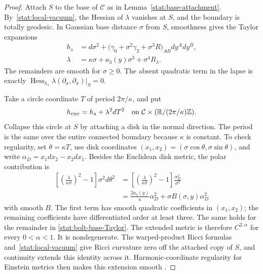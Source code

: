 \begin{proof}
Attach $S$ to the base of $\mathcal C$ as in
Lemma~\ref{stat:base-attachment}.  By~\eqref{stat:local-vacuum},
the Hessian of $\lambda$ vanishes at $S$, and the boundary is
totally geodesic.  In Gaussian base distance $\sigma$ from $S$,
smoothness gives the Taylor expansions
\begin{align}
 h_s&=d\sigma^2+
       \bigl(\gamma_0+\sigma^2\gamma_2
                         +\sigma^3R\bigr)_{AB}dy^A dy^B,
 \label{stat:bolt-base-Taylor}\\
 \lambda&=\kappa\sigma+a_3(y)\sigma^3
                              +\sigma^4R_\lambda.
 \label{stat:bolt-lapse-Taylor}
\end{align}
The remainders are smooth for $\sigma\geq0$.  The absent quadratic
term in the lapse is exactly
$\operatorname{Hess}_{h_s}\lambda(\partial_\sigma,
\partial_\sigma)|_S=0$.

Take a circle coordinate $T$ of period $2\pi/\kappa$, and put
\begin{equation}
 h_{\mathrm{circ}}=h_s+\lambda^2dT^2
 \quad\hbox{on }\mathcal C\times
                  (\mathbb R/(2\pi/\kappa)\mathbb Z).
 \label{stat:circle-metric}
\end{equation}
Collapse this circle at $S$ by attaching a disk in the normal
direction.  The period is the same over the entire connected
boundary because $\kappa$ is constant.  To check regularity, set
$\theta=\kappa T$, use disk coordinates
$(x_1,x_2)=(\sigma\cos\theta,\sigma\sin\theta)$, and write
$\alpha_D=x_1dx_2-x_2dx_1$.  Besides the Euclidean disk metric,
the polar contribution is
\begin{align*}
 \left[\left(\frac{\lambda}{\kappa\sigma}\right)^2-1\right]
        \sigma^2d\theta^2
 &=\left[\left(\frac{\lambda}{\kappa\sigma}\right)^2-1\right]
        \frac{\alpha_D^2}{\sigma^2}\\
 &=\frac{2a_3(y)}\kappa\alpha_D^2
          +\sigma B(\sigma,y)\alpha_D^2
\end{align*}
with smooth $B$.  The first term has smooth quadratic coefficients
in $(x_1,x_2)$; the remaining coefficients have differentiated
order at least three.  The same holds for the remainder in
\eqref{stat:bolt-base-Taylor}.  The extended metric is therefore
$C^{2,\alpha}$ for every $0<\alpha<1$.  It is nondegenerate.
The warped-product Ricci formulas and~\eqref{stat:local-vacuum}
give Ricci curvature zero off the attached copy of $S$, and
continuity extends this identity across it.  Harmonic-coordinate
regularity for Einstein metrics then makes this extension smooth
\cite{DeTurckKazdan1981}.


\end{proof}
